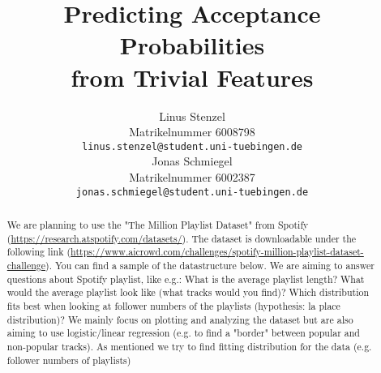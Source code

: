 \documentclass{article}
\title{Predicting Acceptance Probabilities\\ from Trivial Features}
\author{
  Linus Stenzel\\
  Matrikelnummer 6008798\\
  \texttt{linus.stenzel@student.uni-tuebingen.de} \\
  \And
  Jonas Schmiegel\\
  Matrikelnummer 6002387\\
  \texttt{jonas.schmiegel@student.uni-tuebingen.de} \\
}
\begin{document}
\maketitle

\begin{abstract}
  We are planning to use the "The Million Playlist Dataset" from Spotify (\url{https://research.atspotify.com/datasets/}). The dataset is downloadable under the following link (\url{https://www.aicrowd.com/challenges/spotify-million-playlist-dataset-challenge}). You can find a sample of the datastructure below.
  We are aiming to answer questions about Spotify playlist, like e.g.: What is the average playlist length? What would the average playlist look like (what tracks would you find)? Which distribution fits best when looking at follower numbers of the playlists (hypothesis: la place distribution)? 
  We mainly focus on plotting and analyzing the dataset but are also aiming to use logistic/linear regression (e.g. to find a "border" between popular and non-popular tracks). As mentioned we try to find fitting distribution for the data (e.g. follower numbers of playlists)
\end{abstract}




% 

\end{document}
